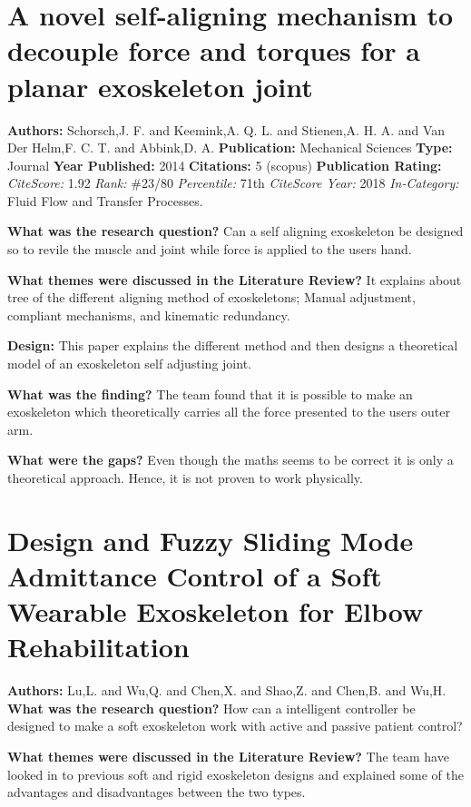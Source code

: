 \section{A novel self-aligning mechanism to decouple force and torques for a planar exoskeleton joint} 
\textbf{Authors:} Schorsch,J. F. and Keemink,A. Q. L. and Stienen,A. H. A. and Van Der Helm,F. C. T. and Abbink,D. A. \newline
\textbf{Publication:} Mechanical Sciences
\textbf{Type:} Journal \newline
\textbf{Year Published:} 2014
\textbf{Citations:} 5 (scopus) \newline 
\textbf{Publication Rating:}    
\textit{CiteScore:} 1.92 \textit{Rank:} \#23/80 \textit{Percentile:} 71th \newline
\textit{CiteScore Year:} 2018
\textit{In-Category:} Fluid Flow and Transfer Processes.

\textbf{What was the research question?}
Can a self aligning exoskeleton be designed so to revile the muscle and joint while force is applied to the users hand. 

\textbf{What themes were discussed in the Literature Review?}   
It explains about tree of the different aligning method of exoskeletons; Manual adjustment, compliant mechanisms, and kinematic redundancy.

\textbf{Design:}  
This paper explains the different method and then designs a theoretical model of an exoskeleton self adjusting joint. 

\textbf{What was the finding?} 
The team found that it is possible to make an exoskeleton which  theoretically carries all the force presented to the users outer arm.  

\textbf{What were the gaps?}   
Even though the maths seems to be correct it is only a theoretical approach. Hence, it is not proven to work physically. 


\section{Design and Fuzzy Sliding Mode Admittance Control of a Soft Wearable Exoskeleton for Elbow Rehabilitation} 
\textbf{Authors:} Lu,L. and Wu,Q. and Chen,X. and Shao,Z. and Chen,B. and Wu,H.  \newline
\textbf{What was the research question?}
How can a intelligent controller be designed to make a soft exoskeleton work with active and passive patient control? 

\textbf{What themes were discussed in the Literature Review?}
The team have looked in to previous soft and rigid exoskeleton designs and explained some of the advantages and disadvantages between the two types.  

